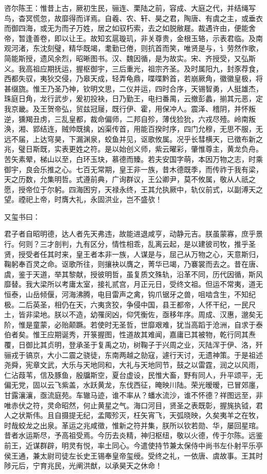 \documentclass[]{article}
\begin{document}
咨尔陈王：惟昔上古，厥初生民，骊连、栗陆之前，容成、大庭之代，并结绳写鸟，杳冥慌忽，故靡得而详焉。自羲、农、轩、昊之君，陶唐、有虞之主，或垂衣而御四海，或无为而子万姓，居之如驭朽索，去之如脱敝屣。裁遇许由，便能舍帝，暂逢善卷，即以让王。故知玄扈璇玑，非关尊贵，金根玉辂，示表君临。及南观河渚，东沈刻璧，精华既竭，耄勤已倦，则抗首而笑，唯贤是与，讠劳然作歌，简能斯授，遗风余烈，昭晰图书。汉、魏因循，是为故实。宋、齐授受，又弘斯义。我高祖应期抚运，握枢御宇，三后重光，祖宗齐圣。及时属阳九，封豕荐食，西都失驭，夷狄交侵，乃皋天成，轻弄龟鼎，喋喋黔首，若崩厥角，徽徽皇极，将甚缀旒。惟王乃圣乃神，钦明文思，二仪并运，四时合序，天锡智勇，人挺雄杰，珠庭日角，龙行武步，爰初投袂，日乃勤王，电扫番禺，云撤彭蠡，揃其元恶，定我京畿。及王贺帝弘，贸兹冠屦，既行伊、霍，用保冲人。震泽、稽阴，并怀叛逆，獯羯丑虏，三乱皇都，裁命偏师，二邦自殄，薄伐猃狁，六戎尽殪。岭南叛涣，湘、郢结连，贼帅既擒，凶渠传首，用能百揆时序，四门允穆，无思不服，无远不届，上达穹昊，下漏渊泉，蛟鱼并见，讴歌攸属。况乎长彗横天，已徵布新之兆，璧日斯既，实表更姓之符。是以始创义师，紫云曜彩，肇惟尊主，黄龙负舟。苦矢素翚，梯山以至，白环玉玦，慕德而臻。若夫安国字萌，本因万物之志，时乘御宇，良会乐推之心。七百无常期，皇王非一族，昔木德既季，而传祚于我有梁，天之历数，允集明哲。式遵前典，广询群议，王公卿尹，莫不攸属，敬从人祇之愿，授帝位于尔躬。四海困穷，天禄永终，王其允执厥中，轨仪前式，以副溥天之望。禋祀上帝，时膺大礼，永固洪业，岂不盛欤！

又玺书曰：

君子者自昭明德，达人者先天弗违，故能进退咸亨，动静元吉。朕虽蒙寡，庶乎景行。何则？三才剖判，九有区分，情性相乖，乱离云起，是以建彼司牧，推乎圣贤，授受者任其时来，皇王者本非一族，人谋是与，屈己从万物之心，天意斯归，鞠躬奉百灵之命。讴歌所往，则攘袂以膺之，菁华已竭，乃褰裳而去之。昔在唐、虞，鉴于天道，举其黎献，授彼明哲，虽复质文殊轨，沿革不同，历代因循，斯风靡替。我大梁所以考庸太室，接礼贰宫，月正元日，受终文祖。但运不常夷，道无恒泰，山岳倾偃，河海沸腾，电目雷声之禽，钩爪锯牙之兽，咀啮含生，不知纪极。二后英圣，相仍在天，六夷贪狡，争侵中国，县王都帝，人怀干纪，一民尺土，皆非梁地。朕以不造，幼罹闵凶，仰凭衡佐，亟移年序。周成、汉惠，邈矣无阶，惟是童蒙，必贻颠蹶。若使时无圣哲，世靡艰难，犹当高蹈于沧洲，自求于泰伯者矣。惟王应期诞秀，开箓握图，性道故其难闻，嘉庸已其被物，乾行同其焘覆，日御比其贞明，登承圣于复禹之功，树鞠子于兴周之业，灭陆浑于伊、洛，歼骊戎于镐京，大小二震之骁徒，东南两越之勍寇，遽行天讨，无遗神策。于是祖述尧舜，宪章文武，大乐与天地同和，大礼与天地同节，鼓之以雷霆，润之以风雨，仁沾葭苇，信及豚鱼，殷牖斯空，夏台虚设，民惟大畜，野有同人，升平颂平，无偏无党，固以云飞紫盖，水跃黄龙，东伐西征，晻映川陆。荣光暧暧，已冒郊廛，甘露瀼瀼，亟流庭苑。车辙马迹，谁不率从？蟠水流沙，谁不怀德？祥图远至，非唯赤伏之符，灵命昭然，何止黄星之气。海口河目，贤圣之表既彰，握旄执钺，君人之状斯伟。且自摄提无纪，孟陬殄灭，枉矢宵飞，天弧晓映，久矣夷羊之在牧，时哉蛟龙之出泉。革运之兆咸徵，惟新之符并集，朕所以钦若勋、华，屡回星琯。昔者水运斯尽，予高祖受焉。今历去炎精，神归枢纽，敬以火德，传于尔陈。远鉴前王，近谋群辟，明灵有悦，率土同心。今遣使持节兼太保侍中尚书左仆射平乐亭侯王通，兼太尉司徒左长史王锡奉皇帝玺绶。受终之礼，一依唐、虞故事。王其时陟元后，宁育兆民，光阐洪猷，以承昊天之休命！
\end{document}

